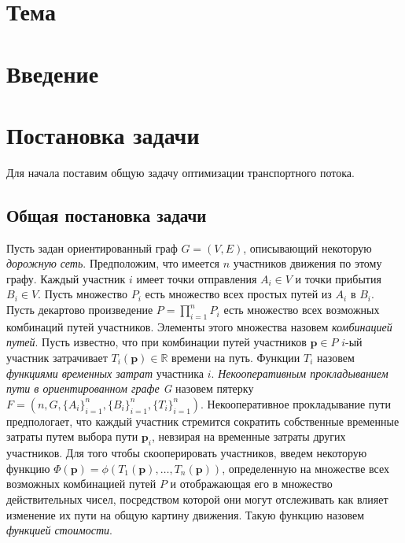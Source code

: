 \documentclass[12pt, a4paper]{article}
\begin{document}
\newpage
\pagestyle{plain}
\tableofcontents{}
\newpage	
	
 \section*{Тема}



\section{Введение}


\newpage
\section{Постановка задачи}

Для начала поставим общую задачу оптимизации транспортного потока.


\subsection{Общая постановка задачи}

Пусть задан ориентированный граф $G = (V, E)$, описывающий некоторую \textit{дорожную сеть}. Предположим, что имеется $n$ участников движения по этому графу. Каждый участник $i$ имеет точки отправления $A_i \in V$ и точки прибытия $B_i \in V$. Пусть множество $P_i$ есть множество всех простых путей из $A_i$ в $B_i$. Пусть декартово произведение ${P = \prod \limits_{i = 1} ^ n P_i}$ есть множество всех возможных комбинаций путей участников. Элементы этого множества назовем \textit{комбинацией путей}. Пусть известно, что при комбинации путей участников ${\textbf{p} \in P}$ $i$-ый участник затрачивает $T_i(\textbf{p}) \in \mathbb{R}$ времени на путь. 
Функции  $T_i$ назовем \textit{функциями временных затрат} участника $i$.
\textit{Некооперативным прокладыванием пути в ориентированном графе G} назовем пятерку $F = (n, G, \{A_i\}_{i = 1}^{n}, \{B_i\}_{i = 1}^{n}, \{T_i\}_{i = 1}^{n})$. Некооперативное прокладывание пути предпологает, что каждый участник стремится сократить собственные временные затраты путем выбора пути $\textbf{p}_i$, невзирая на временные затраты других участников. 
Для того чтобы скооперировать участников, введем некоторую функцию $\Phi (\textbf{p}) = \phi (T_1 (\textbf{p}), \ldots, T_n(\textbf{p}))$, определенную на множестве всех возможных комбинацией путей $P$ и отображающая его в множество действительных чисел, посредством которой они могут отслеживать как влияет изменение их пути на общую картину движения. Такую функцию назовем \textit{функцией стоимости}.
\end{document}
